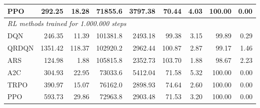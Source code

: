 \begin{samepage}
\begin{center}
\begin{tabular}{l|rr|rr|rr|rr}
    PPO          &   292.25 &    18.28 &    71855.6 &    3797.38 &   70.44 &    4.03 &  100.00 &    0.00 \\
    \midrule
    \multicolumn{9}{l}{\textit{RL methods trained for 1.000.000 steps}} \\
    \midrule
    DQN          &   246.35 &    11.39 &   101381.8 &    2493.18 &   99.38 &    3.15 &   99.89 &    0.29 \\
    QRDQN        &  1351.42 &   118.37 &   102920.2 &    2962.44 &  100.87 &    2.87 &   99.17 &    1.46 \\
    ARS          &   124.98 &     1.88 &   105815.8 &    2352.73 &  103.70 &    1.88 &   98.67 &    2.23 \\
    A2C          &   304.93 &    22.95 &    73033.6 &    5412.04 &   71.58 &    5.32 &  100.00 &    0.00 \\
    TRPO         &   390.97 &    15.07 &    76162.0 &    2898.93 &   74.64 &    2.60 &  100.00 &    0.00 \\
    PPO          &   593.73 &    29.86 &    72963.8 &    2903.48 &   71.53 &    3.20 &  100.00 &    0.00 \\
    \bottomrule
  \end{tabular}
\end{center}
\end{samepage}


